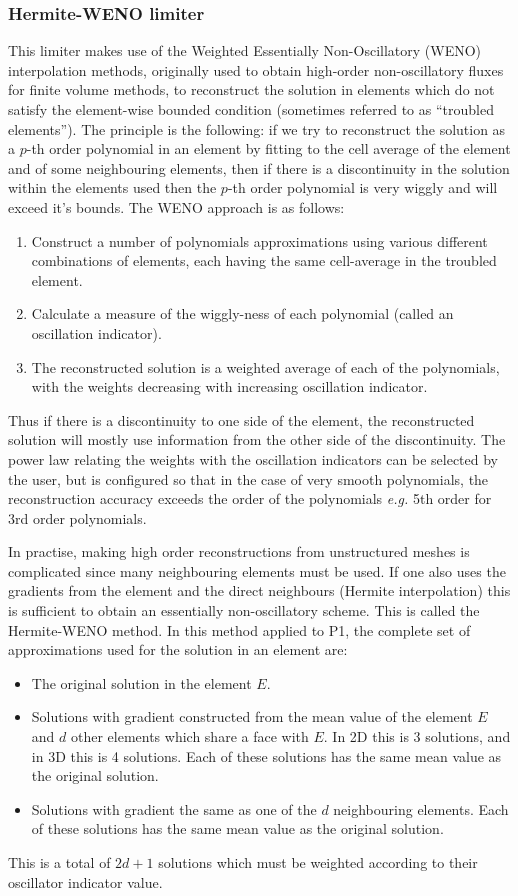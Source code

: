 \subsubsection{Hermite-WENO limiter}
This limiter makes use of the Weighted Essentially Non-Oscillatory
(WENO) interpolation methods, originally used to obtain high-order
non-oscillatory fluxes for finite volume methods, to reconstruct the
solution in elements which do not satisfy the element-wise bounded
condition (sometimes referred to as ``troubled elements''). The
principle is the following: if we try to reconstruct the solution as a
$p$-th order polynomial in an element by fitting to the cell average
of the element and of some neighbouring elements, then if there is a
discontinuity in the solution within the elements used then the $p$-th
order polynomial is very wiggly and will exceed it's bounds. The WENO
approach is as follows:
\begin{enumerate}
\item Construct a number of polynomials approximations using various
  different combinations of elements, each having the same cell-average
  in the troubled element.
\item Calculate a measure of the wiggly-ness of each polynomial (called 
an oscillation indicator).
\item The reconstructed solution is a weighted average of each of the
  polynomials, with the weights decreasing with increasing oscillation
  indicator.
\end{enumerate}
Thus if there is a discontinuity to one side of the element, the
reconstructed solution will mostly use information from the other side
of the discontinuity. The power law relating the weights with the
oscillation indicators can be selected by the user, but is configured
so that in the case of very smooth polynomials, the reconstruction
accuracy exceeds the order of the polynomials \emph{e.g.} 5th order for
3rd order polynomials. 

In practise, making high order reconstructions from unstructured
meshes is complicated since many neighbouring elements must be
used. If one also uses the gradients from the element and the direct
neighbours (Hermite interpolation) this is sufficient to obtain an
essentially non-oscillatory scheme. This is called the Hermite-WENO
method. In this method applied to P1, the complete set of
approximations used for the solution in an element are:
\begin{itemize}
\item The original solution in the element $E$.
\item Solutions with gradient constructed from the mean value of the
  element $E$ and $d$ other elements which share a face with $E$.  In
  2D this is 3 solutions, and in 3D this is 4 solutions. Each of these
  solutions has the same mean value as the original solution.
\item Solutions with gradient the same as one of the $d$ neighbouring
  elements. Each of these solutions has the same mean value as the
  original solution.
\end{itemize}
This is a total of $2d+1$ solutions which must be weighted according
to their oscillator indicator value.

